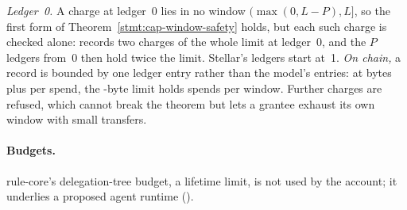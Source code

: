 

\noindent\emph{Ledger~0.} A charge at ledger~0 lies in no window
$(\max(0, L-P), L]$, so the first form of Theorem~\ref{stmt:cap-window-safety}
holds, but each such charge is checked alone: 
records two charges of the whole limit at ledger~0, and the $P$ ledgers from~0
then hold twice the limit. Stellar's ledgers start at~1.
\emph{On chain,} a record is bounded by one ledger entry rather than the model's
 entries: at  bytes
plus  per spend, the
-byte limit holds  spends
per window. Further charges are refused, which cannot break the theorem but lets
a grantee exhaust its own window with small transfers.

\paragraph{Budgets.} rule-core's delegation-tree budget, a lifetime limit, is
not used by the account; it underlies a proposed agent runtime
().


